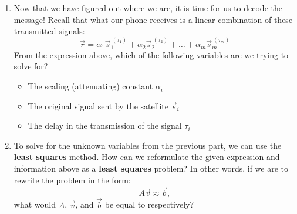 \begin{enumerate}
    \item Now that we have figured out where we are, it is time for us to decode the message! Recall that what our phone receives is a linear combination of these transmitted signals:
    $$\vec{r} = \alpha_1 \vec{s}_1^{\ (\tau_1)} + \alpha_2 \vec{s}_2^{\ (\tau_2)} + \hdots + \alpha_m \vec{s}_m^{\ (\tau_m)}$$
    From the expression above, which of the following variables are we trying to solve for?
    \begin{itemize}
        \item The scaling (attenuating) constant $\alpha_i$
        \item The original signal sent by the satellite $\vec{s}_i$
        \item The delay in the transmission of the signal $\tau_i$
    \end{itemize}

    \answerbox{3cm}


    \item To solve for the unknown variables from the previous part, we can use the \textbf{least squares} method. How can we reformulate the given expression and information above as a \textbf{least squares} problem? In other words, if we are to rewrite the problem in the form:
    $$A\vec{v} \approx \vec{b},$$
    what would $A$, $\vec{v}$, and $\vec{b}$ be equal to respectively?
    
    \answerbox{4cm}


\end{enumerate}
